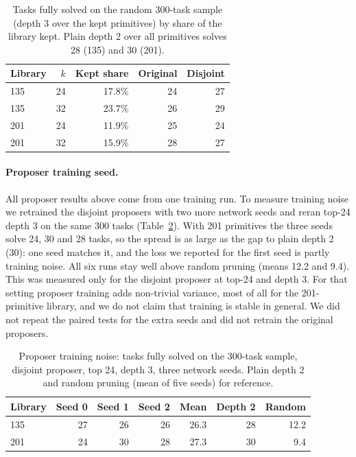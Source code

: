 \documentclass[sigconf,nonacm]{acmart}
\begin{document}
\begin{table}[t]
\caption{Tasks fully solved on the random 300-task sample (depth 3 over the kept primitives) by share of the library kept. Plain depth 2 over all primitives solves 28 (135) and 30 (201).}
\label{tab:share}
\small
\begin{tabular}{@{}lrrrr@{}}
\toprule
Library & $k$ & Kept share & Original & Disjoint \\
\midrule
135 & 24 & 17.8\% & 24 & 27 \\
135 & 32 & 23.7\% & 26 & 29 \\
201 & 24 & 11.9\% & 25 & 24 \\
201 & 32 & 15.9\% & 28 & 27 \\
\bottomrule
\end{tabular}
\end{table}

\paragraph{Proposer training seed.} All proposer results above come from one training run. To measure training noise we retrained the disjoint proposers with two more network seeds and reran top-24 depth 3 on the same 300 tasks (Table~\ref{tab:seeds}). With 201 primitives the three seeds solve 24, 30 and 28 tasks, so the spread is as large as the gap to plain depth 2 (30): one seed matches it, and the loss we reported for the first seed is partly training noise. All six runs stay well above random pruning (means 12.2 and 9.4). This was measured only for the disjoint proposer at top-24 and depth 3. For that setting proposer training adds non-trivial variance, most of all for the 201-primitive library, and we do not claim that training is stable in general. We did not repeat the paired tests for the extra seeds and did not retrain the original proposers.

\begin{table}[t]
\caption{Proposer training noise: tasks fully solved on the 300-task sample, disjoint proposer, top 24, depth 3, three network seeds. Plain depth 2 and random pruning (mean of five seeds) for reference.}
\label{tab:seeds}
\small
\begin{tabular}{@{}lrrrrrr@{}}
\toprule
Library & Seed 0 & Seed 1 & Seed 2 & Mean & Depth 2 & Random \\
\midrule
135 & 27 & 26 & 26 & 26.3 & 28 & 12.2 \\
201 & 24 & 30 & 28 & 27.3 & 30 & 9.4 \\
\bottomrule
\end{tabular}
\end{table}
\end{document}
